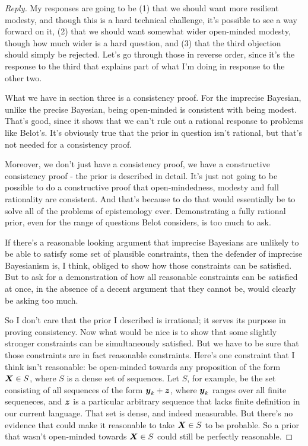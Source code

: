 \begin{proof}[Reply]
\renewcommand{\qedsymbol}{}
My responses are going to be (1) that we should want more resilient modesty, and though this is a hard technical challenge, it's possible to see a way forward on it, (2) that we should want somewhat wider open-minded modesty, though how much wider is a hard question, and (3) that the third objection should simply be rejected. Let's go through those in reverse order, since it's the response to the third that explains part of what I'm doing in response to the other two.

What we have in section three is a consistency proof. For the imprecise Bayesian, unlike the precise Bayesian, being open-minded is consistent with being modest. That's good, since it shows that we can't rule out a rational response to problems like Belot's. It's obviously true that the prior in question isn't rational, but that's not needed for a consistency proof.

Moreover, we don't just have a consistency proof, we have a constructive consistency proof - the prior is described in detail. It's just not going to be possible to do a constructive proof that open-mindedness, modesty and full rationality are consistent. And that's because to do that would essentially be to solve all of the problems of epistemology ever. Demonstrating a fully rational prior, even for the range of questions Belot considers, is too much to ask.

If there's a reasonable looking argument that imprecise Bayesians are unlikely to be able to satisfy some set of plausible constraints, then the defender of imprecise Bayesianism is, I think, obliged to show how those constraints can be satisfied. But to ask for a demonstration of how all reasonable constraints can be satisfied at once, in the absence of a decent argument that they cannot be, would clearly be asking too much.

So I don't care that the prior I described is irrational; it serves its purpose in proving consistency. Now what would be nice is to show that some slightly stronger constraints can be simultaneously satisfied. But we have to be sure that those constraints are in fact reasonable constraints. Here's one constraint that I think isn't reasonable: be open-minded towards any proposition of the form ${\boldsymbol{X} \in S}$, where $S$ is a dense set of sequences. Let $S$, for example, be the set consisting of all sequences of the form $\boldsymbol{y}_k + \boldsymbol{z}$, where $\boldsymbol{y}_k$ ranges over all finite sequeneces, and $\boldsymbol{z}$ is a particular arbitrary sequence that lacks finite definition in our current language. That set is dense, and indeed measurable. But there's no evidence that could make it reasonable to take $\boldsymbol{X} \in S$ to be probable. So a prior that wasn't open-minded towards $\boldsymbol{X} \in S$ could still be perfectly reasonable.


\end{proof}
